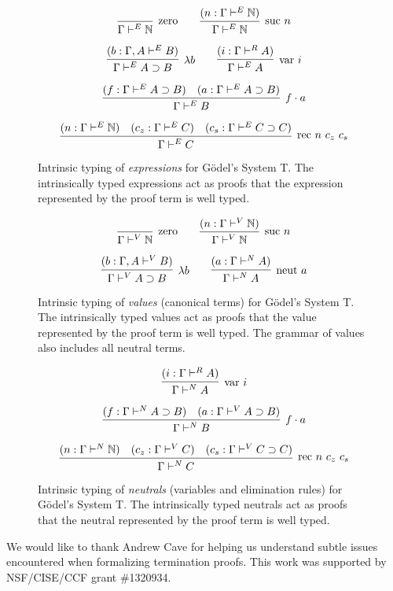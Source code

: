 \documentclass[preprint,nonatbib]{sigplanconf}
\numberwithin{mysubdfn}{mydfn}
\def\arr{\supset}
\def\app{\cdot}
\def\lam{\lambda}
\def\nat{\mathbb{N}}
\newcommand{\con}[1]{\textmd{#1}}
\newcommand{\fun}[1]{\textmd{#1}}
\newcommand{\type}[1]{\Gamma \vdash^E #1}
\newcommand{\ctype}[2]{\Gamma , #1 \vdash^E #2}
\newcommand{\typv}[1]{\Gamma \vdash^V #1}
\newcommand{\ctypv}[2]{\Gamma , #1 \vdash^V #2}
\newcommand{\typn}[1]{\Gamma \vdash^N #1}
\newcommand{\typr}[1]{\Gamma \vdash^R #1}
\begin{document}
\begin{figure}
\caption{
Intrinsic typing of {\it expressions} for G{\"o}del's System T. The
intrinsically typed expressions act as proofs that the expression
represented by the proof term is well typed.
}
$$
\infer
  [\con{zero}]
  {\type{\nat}}
{}
\qquad
\infer
  [\con{suc} ~ n]
  {\type{\nat}}
{
  (n : \type{\nat})
}
$$

$$
\infer
  [\lam b]
  {\type{A \arr B}}
{
  (b : \ctype{A}{B})
}
\qquad
\infer
  [\fun{var} ~ i]
  {\type{A}}
{
  (i : \typr{A})
}
$$

$$
\infer
  [f \app a]
  {\type{B}}
{
  (f : \type{A \arr B})
  &
  (a : \type{A \arr B})
}
$$

$$
\infer
  [\fun{rec} ~ n ~ c_z ~ c_s]
  {\type{C}}
{
  (n : \type{\nat})
  &
  (c_z : \type{C})
  &
  (c_s : \type{C \arr C})
}
$$
\label{fig:type}
\end{figure}

\begin{figure}
\caption{
Intrinsic typing of {\it values} (canonical terms) for G{\"o}del's System T.
The intrinsically typed values act as proofs that the value
represented by the proof term is well typed. The grammar of values
also includes all neutral terms.
}
$$
\infer
  [\con{zero}]
  {\typv{\nat}}
{}
\qquad
\infer
  [\con{suc} ~ n]
  {\typv{\nat}}
{
  (n : \typv{\nat})
}
$$

$$
\infer
  [\lam b]
  {\typv{A \arr B}}
{
  (b : \ctypv{A}{B})
}
\qquad
\infer
  [\fun{neut} ~ a]
  {\typn{A}}
{
  (a : \typn{A})
}
$$
\label{fig:typv}
\end{figure}

\begin{figure}
\caption{
Intrinsic typing of {\it neutrals} (variables and elimination rules) 
for G{\"o}del's System T.
The intrinsically typed neutrals act as proofs that the neutral
represented by the proof term is well typed.
}

$$
\infer
  [\fun{var} ~ i]
  {\typn{A}}
{
  (i : \typr{A})
}
$$

$$
\infer
  [f \app a]
  {\typn{B}}
{
  (f : \typn{A \arr B})
  &
  (a : \typv{A \arr B})
}
$$

$$
\infer
  [\fun{rec} ~ n ~ c_z ~ c_s]
  {\typn{C}}
{
  (n : \typn{\nat})
  &
  (c_z : \typv{C})
  &
  (c_s : \typv{C \arr C})
}
$$
\label{fig:typn}
\end{figure}


\acks

We would like to thank Andrew Cave for helping us understand subtle
issues encountered when formalizing termination proofs.
This work was supported by NSF/CISE/CCF grant \#1320934.



\end{document}
